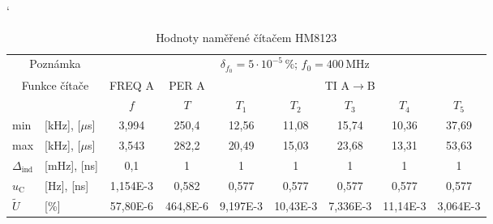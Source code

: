 \documentclass[a4paper, czech]{article}
\begin{document}
\begin{table}[H]
    \catcode`
    \centering
    \caption{Hodnoty naměřené čítačem HM8123}
    \begin{tabular}{ll|ccccccc}
        \toprule
        \multicolumn{2}{c}{Poznámka}          & \multicolumn{7}{c}{$\delta_{f_0} = 5 \cdot 10^{-5}\,\%$;  $f_0 = 400\,\text{MHz}$}                                                                                                    \\
        \cmidrule(rl){1-9}
        \multicolumn{2}{c}{\multirow{3}{*}{Funkce čítače}}     & FREQ A             & PER A              & \multicolumn{5}{c}{TI A$\rightarrow$B}                                                                                  \\
        \cmidrule(rl){3-3}
        \cmidrule(rl){4-4}
        \cmidrule(rl){5-9}
        \multicolumn{2}{c}{\multirow{2}{*}{}} & \multirow{2}{*}{$f$} & \multirow{2}{*}{$T$} & \multirow{2}{*}{$T_1$} & \multirow{2}{*}{$T_2$} & \multirow{2}{*}{$T_3$} & \multirow{2}{*}{$T_4$} & \multirow{2}{*}{$T_5$} \\
        \multicolumn{2}{c}{}                  &                    &                    &                     &                     &                     &                     &                     \\
        \cmidrule(rl){1-9}
        min              & [kHz], [$\mu$s]            & 3,994              & 250,4              & 12,56               & 11,08               & 15,74               & 10,36               & 37,69               \\
        max              & [kHz], [$\mu$s]            & 3,543              & 282,2              & 20,49               & 15,03               & 23,68               & 13,31               & 53,63               \\
        $\Delta_\text{ind}$             & [mHz], [ns]            & 0,1                & 1                  & 1                   & 1                   & 1                   & 1                   & 1                   \\
        $u_\text{C}$               & [Hz], [ns]             & 1,154E-3           & 0,582              & 0,577               & 0,577               & 0,577               & 0,577               & 0,577               \\
        $\tilde{U}$                & [\%]                 & 57,80E-6          & 464,8E-6           & 9,197E-3            & 10,43E-3            & 7,336E-3            & 11,14E-3            & 3,064E-3            \\
        \bottomrule
    \end{tabular}
\end{table}
\end{document}
